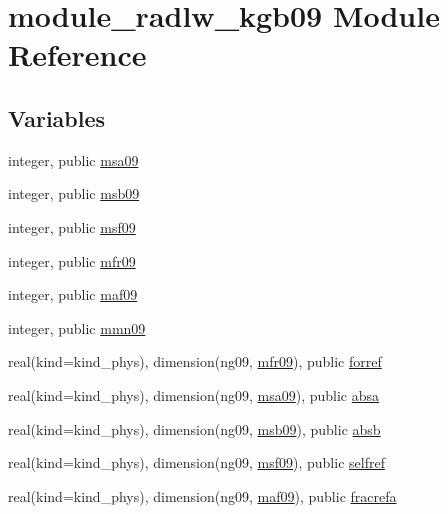 \hypertarget{namespacemodule__radlw__kgb09}{}\section{module\+\_\+radlw\+\_\+kgb09 Module Reference}
\label{namespacemodule__radlw__kgb09}
\subsection*{Variables}
\begin{DoxyCompactItemize}
\item 
integer, public \hyperlink{namespacemodule__radlw__kgb09_ab739f0acab23f3140067506b396b3717}{msa09}
\item 
integer, public \hyperlink{group__module__radlw__main_ga7e6bb7acb0df29586d0bd52f3fc41d90}{msb09}
\item 
integer, public \hyperlink{group__module__radlw__main_ga7d728ef04b3f26c6b20149084334be5a}{msf09}
\item 
integer, public \hyperlink{group__module__radlw__main_ga777f63022c4f7187446945c6e6ba77e7}{mfr09}
\item 
integer, public \hyperlink{group__module__radlw__main_ga7d5d565c87af7ef07dc17930f9cb9e57}{maf09}
\item 
integer, public \hyperlink{group__module__radlw__main_gaa9c8294b56ac3ce90b07114e986777a9}{mmn09}
\item 
real(kind=kind\+\_\+phys), dimension(ng09, \hyperlink{group__module__radlw__main_ga777f63022c4f7187446945c6e6ba77e7}{mfr09}), public \hyperlink{group__module__radlw__main_ga72a8c0879636dba20e2a8a35ba79f681}{forref}
\item 
real(kind=kind\+\_\+phys), dimension(ng09, \hyperlink{namespacemodule__radlw__kgb09_ab739f0acab23f3140067506b396b3717}{msa09}), public \hyperlink{group__module__radlw__main_ga7a8726efe46fac4d6cce55ca357199ab}{absa}
\item 
real(kind=kind\+\_\+phys), dimension(ng09, \hyperlink{group__module__radlw__main_ga7e6bb7acb0df29586d0bd52f3fc41d90}{msb09}), public \hyperlink{group__module__radlw__main_gadb2110a245d9f01b3fd1ab058c883003}{absb}
\item 
real(kind=kind\+\_\+phys), dimension(ng09, \hyperlink{group__module__radlw__main_ga7d728ef04b3f26c6b20149084334be5a}{msf09}), public \hyperlink{group__module__radlw__main_ga1c65e91a215060738292d0ca5a8f38a2}{selfref}
\item 
real(kind=kind\+\_\+phys), dimension(ng09, \hyperlink{group__module__radlw__main_ga7d5d565c87af7ef07dc17930f9cb9e57}{maf09}), public \hyperlink{group__module__radlw__main_gace3d3e2731609f7ea50eb798bd212f3b}{fracrefa}

\end{DoxyCompactItemize}
